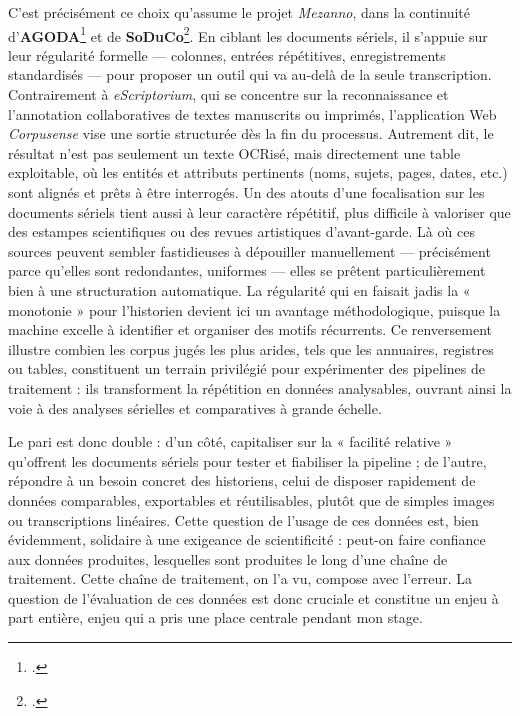 C’est précisément ce choix qu’assume le projet \emph{Mezanno}, dans la continuité d’\textbf{AGODA}\footcite[][]{fanny} et de \textbf{SoDuCo}\footcite[][]{soduco}. En ciblant les documents sériels, il s’appuie sur leur régularité formelle — colonnes, entrées répétitives, enregistrements standardisés — pour proposer un outil qui va au-delà de la seule transcription. Contrairement à \emph{eScriptorium}, qui se concentre sur la reconnaissance et l’annotation collaboratives de textes manuscrits ou imprimés, l'application Web \emph{Corpusense} vise une sortie structurée dès la fin du processus. Autrement dit, le résultat n’est pas seulement un texte OCRisé, mais directement une table exploitable, où les entités et attributs pertinents (noms, sujets, pages, dates, etc.) sont alignés et prêts à être interrogés. Un des atouts d’une focalisation sur les documents sériels tient aussi à leur caractère répétitif, plus difficile à valoriser que des estampes scientifiques ou des revues artistiques d'avant-garde. Là où ces sources peuvent sembler fastidieuses à dépouiller manuellement — précisément parce qu’elles sont redondantes, uniformes — elles se prêtent particulièrement bien à une structuration automatique. La régularité qui en faisait jadis la « monotonie » pour l’historien devient ici un avantage méthodologique, puisque la machine excelle à identifier et organiser des motifs récurrents. Ce renversement illustre combien les corpus jugés les plus arides, tels que les annuaires, registres ou tables, constituent un terrain privilégié pour expérimenter des pipelines de traitement : ils transforment la répétition en données analysables, ouvrant ainsi la voie à des analyses sérielles et comparatives à grande échelle.

Le pari est donc double : d’un côté, capitaliser sur la « facilité relative » qu’offrent les documents sériels pour tester et fiabiliser la pipeline ; de l’autre, répondre à un besoin concret des historiens, celui de disposer rapidement de données comparables, exportables et réutilisables, plutôt que de simples images ou transcriptions linéaires. Cette question de l'usage de ces données est, bien évidemment, solidaire à une exigeance de scientificité : peut-on faire confiance aux données produites, lesquelles sont produites le long d'une chaîne de traitement. Cette chaîne de traitement, on l'a vu, compose avec l'erreur. La question de l'évaluation de ces données est donc cruciale et constitue un enjeu à part entière, enjeu qui a pris une place centrale pendant mon stage. 
